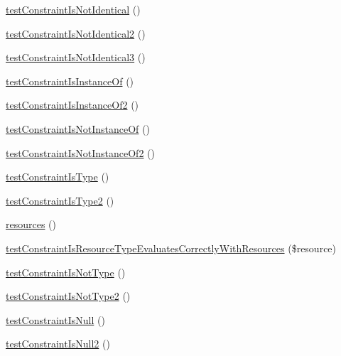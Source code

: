 \begin{DoxyCompactItemize}
\item 
\mbox{\hyperlink{class_framework___constraint_test_a293b548e581b80d884547bbf0c5357a9}{test\+Constraint\+Is\+Not\+Identical}} ()
\item 
\mbox{\hyperlink{class_framework___constraint_test_ab25ca08423b9ecc51a47bc815cc9e45c}{test\+Constraint\+Is\+Not\+Identical2}} ()
\item 
\mbox{\hyperlink{class_framework___constraint_test_a61bdb260e3d13ceaeb93f5e46f679aff}{test\+Constraint\+Is\+Not\+Identical3}} ()
\item 
\mbox{\hyperlink{class_framework___constraint_test_a8ae31fd27f410a8ca147bec83602784b}{test\+Constraint\+Is\+Instance\+Of}} ()
\item 
\mbox{\hyperlink{class_framework___constraint_test_ab3c56eae95a02434bc81188d66c43d2b}{test\+Constraint\+Is\+Instance\+Of2}} ()
\item 
\mbox{\hyperlink{class_framework___constraint_test_a876165a884f43ae274eb0b995dc4a829}{test\+Constraint\+Is\+Not\+Instance\+Of}} ()
\item 
\mbox{\hyperlink{class_framework___constraint_test_aaba38996220090e8066276400445f456}{test\+Constraint\+Is\+Not\+Instance\+Of2}} ()
\item 
\mbox{\hyperlink{class_framework___constraint_test_a29b72843022453df1d7bdcb1ef44942c}{test\+Constraint\+Is\+Type}} ()
\item 
\mbox{\hyperlink{class_framework___constraint_test_af81c58d22557ee4c53fc33be0129a03b}{test\+Constraint\+Is\+Type2}} ()
\item 
\mbox{\hyperlink{class_framework___constraint_test_a2f0ab513e2f21d1e3951ee26ffe1f260}{resources}} ()
\item 
\mbox{\hyperlink{class_framework___constraint_test_a0e4ed58e4d2ee2b494b69380a529552e}{test\+Constraint\+Is\+Resource\+Type\+Evaluates\+Correctly\+With\+Resources}} (\$resource)
\item 
\mbox{\hyperlink{class_framework___constraint_test_a647b080711c7c674c7d32365406e5ec6}{test\+Constraint\+Is\+Not\+Type}} ()
\item 
\mbox{\hyperlink{class_framework___constraint_test_a463837643f8b6d8bf0dbc025c9d6251c}{test\+Constraint\+Is\+Not\+Type2}} ()
\item 
\mbox{\hyperlink{class_framework___constraint_test_a06d9e860b5e368a62a3ba57ffd2a4615}{test\+Constraint\+Is\+Null}} ()
\item 
\mbox{\hyperlink{class_framework___constraint_test_a5aa40a30c8e84c073f8ae71bcff8e27d}{test\+Constraint\+Is\+Null2}} ()

\end{DoxyCompactItemize}
